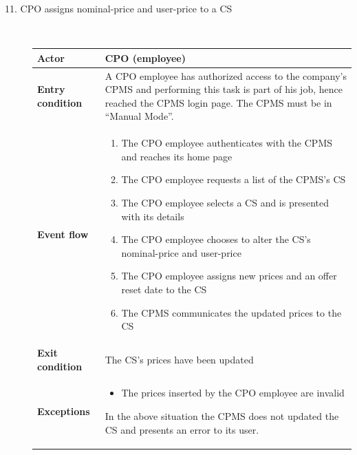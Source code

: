 \documentclass[11pt]{article}
\begin{document}
\begin{description}
    \item [11. CPO assigns nominal-price and user-price to a CS] \hfill \\
    \begin{table}[H]
        \centering
        \setlength{\tabcolsep}{18pt}
        \renewcommand{\arraystretch}{1.4}
        \begin{tabularx}{\textwidth}{|>{\hsize=0.5\hsize}X|>{\hsize=1.5\hsize}X|}
            \hline
            \textbf{Actor} & CPO (employee) \\
            \hline
            \textbf{Entry condition} & A CPO employee has authorized access to the company's CPMS and performing this task is part of his job, hence reached the CPMS login page. The CPMS must be in “Manual Mode”. \\
            \hline
            \textbf{Event flow} & 
                \begin{minipage}[t]{\hsize}
                \begin{enumerate}[topsep=0pt, leftmargin=*]
                    \item The CPO employee authenticates with the CPMS and reaches its home page
                    \item The CPO employee requests a list of the CPMS's CS
                    \item The CPO employee selects a CS and is presented with its details
                    \item The CPO employee chooses to alter the CS's nominal-price and user-price
                    \item The CPO employee assigns new prices and an offer reset date to the CS
                    \item The CPMS communicates the updated prices to the CS
                \end{enumerate}
                \end{minipage}
                \vspace{6pt}
            \\
            \hline
            \textbf{Exit condition} & The CS's prices have been updated \\
            \hline
            \textbf{Exceptions} & 
                \begin{minipage}[t]{\hsize}
                \vspace{0pt}
                \begin{itemize}[topsep=0pt, leftmargin=*]
                    \item The prices inserted by the CPO employee are invalid 
                \end{itemize}
                \vspace{8pt}
                \end{minipage}
                In the above situation the CPMS does not updated the CS and presents an error to its user.
                \vspace{6pt}
            \\
            \hline
        \end{tabularx}
    \end{table}
    

\end{description}
\end{document}
